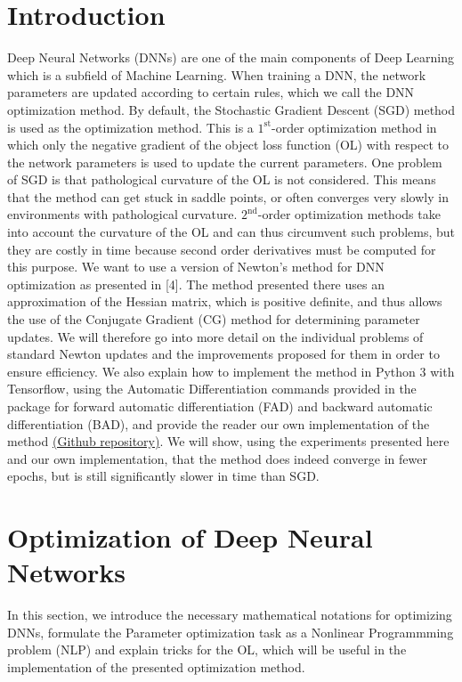 \documentclass[conference]{IEEEtran}
\begin{document}
\section{Introduction} 
Deep Neural Networks (DNNs) are one of the main components of Deep Learning which is a subfield of Machine Learning. When training a DNN, the network parameters are updated according to certain rules, which we call the DNN optimization method. By default, the Stochastic Gradient Descent (SGD) method is used as the optimization method. This is a $1^{\text{st}}$-order optimization method in which only the negative gradient of the object loss function (OL) with respect to the network parameters is used to update the current parameters.
One problem of SGD is that pathological curvature of the OL is not considered. This means that the method can get stuck in saddle points, or often converges very slowly in environments with pathological curvature. 
$2^{\text{nd}}$-order optimization methods take into account the curvature of the OL and can thus circumvent such problems, but they are costly in time because second order derivatives must be computed for this purpose. 
We want to use a version of Newton's method for DNN optimization as presented in [4].
The method presented there uses an approximation of the Hessian matrix, which is positive definite, and thus allows the use of the Conjugate Gradient (CG) method for determining parameter updates. We will therefore go into more detail on the individual problems of standard Newton updates and the improvements proposed for them in order to ensure efficiency.
We also explain how to implement the method in Python 3 with Tensorflow, using the Automatic Differentiation commands provided in the package for forward automatic differentiation (FAD) and backward automatic differentiation (BAD), and provide the reader our own implementation of the method \href{https://github.com/NiklasBrunn/Hessian_Free_Optimization_of_Deep_Neural_Networks}{(Github repository)}. We will show, using the experiments presented here and our own implementation, that the method does indeed converge in fewer epochs, but is still significantly slower in time than SGD.


\section{Optimization of Deep Neural Networks}
In this section, we introduce the necessary mathematical notations for optimizing DNNs, formulate the Parameter optimization task as a Nonlinear Programmming problem (NLP) and explain tricks for the OL, which will be useful in the implementation of the presented optimization method.
\end{document}
